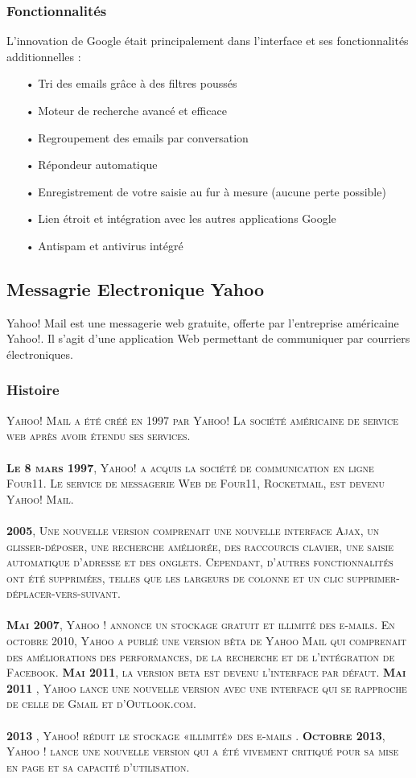 \documentclass[french]{report}
\begin{document}
\begin{titlepage}
\subsubsection{\LARGE Fonctionnalités}
\LARGE L’innovation de Google était principalement dans l’interface et ses fonctionnalités additionnelles :
\begin{itemize}
    \item[•	Tri des emails grâce à des filtres poussés]
    \item[•	Moteur de recherche avancé et efficace]
    \item[•	Regroupement des emails par conversation]
    \item[•	Répondeur automatique]
    \item[• Enregistrement de votre saisie au fur à mesure (aucune perte possible)]
    \item[•	Lien étroit et intégration avec les autres applications Google]
    \item[•	Antispam et antivirus intégré]
\end{itemize}
\subsection{\LARGE Messagrie Electronique Yahoo}
\LARGE Yahoo! Mail est une messagerie web gratuite, offerte par l'entreprise américaine Yahoo!. Il s'agit d'une application Web permettant de communiquer par courriers électroniques.
\subsubsection{\LARGE Histoire}
\LARGE \textsc{ Yahoo! Mail  a été créé en 1997  par Yahoo! La société américaine de service web après avoir étendu ses services.\\ \\
\textbf{Le 8 mars 1997}, Yahoo! a acquis la société de communication en ligne Four11. Le service de messagerie Web de Four11, Rocketmail, est devenu Yahoo! Mail.\\ \\
\textbf{2005}, Une nouvelle version comprenait une nouvelle interface Ajax, un glisser-déposer, une recherche améliorée, des raccourcis clavier, une saisie automatique d'adresse et des onglets. Cependant, d'autres fonctionnalités ont été supprimées, telles que les largeurs de colonne et un clic supprimer-déplacer-vers-suivant.\\ \\
\textbf{Mai 2007}, Yahoo ! annonce un stockage gratuit et illimité des e-mails.
En octobre 2010, Yahoo a publié une version bêta de Yahoo Mail qui comprenait des améliorations des performances, de la recherche et de l'intégration de Facebook.
\textbf{Mai 2011}, la version beta est devenu l'interface par défaut.
\textbf{Mai 2011} , Yahoo lance une nouvelle version avec une interface qui se rapproche de celle de Gmail et d’Outlook.com.\\ \\
\textbf{2013} , Yahoo! réduit le stockage «illimité» des e-mails .
\textbf{Octobre 2013}, Yahoo ! lance une nouvelle version qui a été vivement critiqué pour sa mise en page et sa capacité d'utilisation.}

\end{titlepage}
\end{document}
